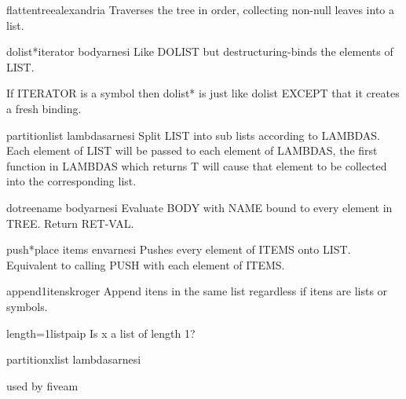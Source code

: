 \begin{function}{flatten}{tree}{alexandria}{}
  Traverses the tree in order, collecting non-null leaves into a list.
\end{function}

\begin{macro}{dolist*}{iterator \body body}{arnesi}{}
  Like DOLIST but destructuring-binds the elements of LIST.

If ITERATOR is a symbol then dolist* is just like dolist EXCEPT
that it creates a fresh binding.
\end{macro}

\begin{function}{partition}{list \rest lambdas}{arnesi}{}
  Split LIST into sub lists according to LAMBDAS. Each element of LIST
  will be passed to each element of LAMBDAS, the first function in
  LAMBDAS which returns T will cause that element to be collected into
  the corresponding list.
\end{function}

\begin{macro}{dotree}{name \body body}{arnesi}{}
  Evaluate BODY with NAME bound to every element in TREE. Return RET-VAL.
\end{macro}

\begin{macro}{push*}{place \rest items \env env}{arnesi}{}
  Pushes every element of ITEMS onto LIST. Equivalent to calling PUSH
  with each element of ITEMS.
\end{macro}

\begin{function}{append1}{\rest itens}{kroger}{}
  Append itens in the same list regardless if itens are lists or
  symbols.
\end{function}

\begin{function}{length=1}{list}{paip}{}
  Is x a list of length 1?
\end{function}

\begin{function}{partitionx}{list \rest lambdas}{arnesi}{}

  used by fiveam
\end{function}

